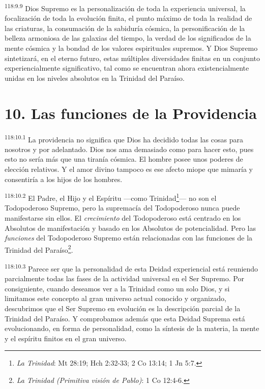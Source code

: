 \documentclass[twoside, 11pt]{book}
\begin{document}
\par
\textsuperscript{118:9.9} Dios Supremo es la personalización de toda la experiencia universal, la focalización de toda la evolución finita, el punto máximo de toda la realidad de las criaturas, la consumación de la sabiduría cósmica, la personificación de la belleza armoniosa de las galaxias del tiempo, la verdad de los significados de la mente cósmica y la bondad de los valores espirituales supremos. Y Dios Supremo sintetizará, en el eterno futuro, estas múltiples diversidades finitas en un conjunto experiencialmente significativo, tal como se encuentran ahora existencialmente unidas en los niveles absolutos en la Trinidad del Paraíso.

\section*{10. Las funciones de la Providencia}
\par
\textsuperscript{118:10.1} La providencia no significa que Dios ha decidido todas las cosas para nosotros y por adelantado. Dios nos ama demasiado como para hacer esto, pues esto no sería más que una tiranía cósmica. El hombre posee unos poderes de elección relativos. Y el amor divino tampoco es ese afecto miope que mimaría y consentiría a los hijos de los hombres.

\par
\textsuperscript{118:10.2} El Padre, el Hijo y el Espíritu ---como Trinidad\footnote{\textit{La Trinidad}: Mt 28:19; Hch 2:32-33; 2 Co 13:14; 1 Jn 5:7.}--- no son el Todopoderoso Supremo, pero la supremacía del Todopoderoso nunca puede manifestarse sin ellos. El \textit{crecimiento} del Todopoderoso está centrado en los Absolutos de manifestación y basado en los Absolutos de potencialidad. Pero las \textit{funciones} del Todopoderoso Supremo están relacionadas con las funciones de la Trinidad del Paraíso\footnote{\textit{La Trinidad (Primitiva visión de Pablo)}: 1 Co 12:4-6.}.

\par
\textsuperscript{118:10.3} Parece ser que la personalidad de esta Deidad experiencial está reuniendo parcialmente todas las fases de la actividad universal en el Ser Supremo. Por consiguiente, cuando deseamos ver a la Trinidad como un solo Dios, y si limitamos este concepto al gran universo actual conocido y organizado, descubrimos que el Ser Supremo en evolución es la descripción parcial de la Trinidad del Paraíso. Y comprobamos además que esta Deidad Suprema está evolucionando, en forma de personalidad, como la síntesis de la materia, la mente y el espíritu finitos en el gran universo.
\end{document}
